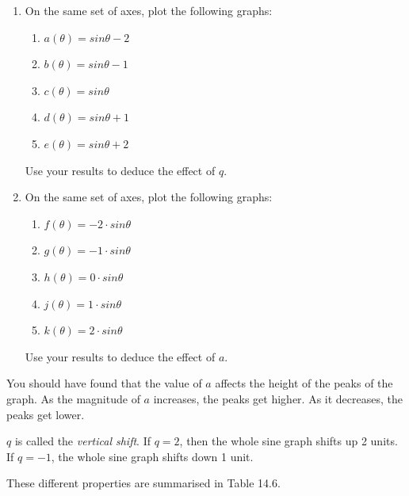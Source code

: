 \label{m39414*id84695}\begin{enumerate}[noitemsep, label=\textbf{\arabic*}. ] 
\label{m39414*uid34}\item On the same set of axes, plot the following graphs:
\label{m39414*id84710}\begin{enumerate}[noitemsep, label=\textbf{\alph*}. ] 
\label{m39414*uid35}\item $a\left(\theta \right)=sin\theta -2$\label{m39414*uid36}\item $b\left(\theta \right)=sin\theta -1$\label{m39414*uid37}\item $c\left(\theta \right)=sin\theta $\label{m39414*uid38}\item $d\left(\theta \right)=sin\theta +1$\label{m39414*uid39}\item $e\left(\theta \right)=sin\theta +2$\end{enumerate}
Use your results to deduce the effect of $q$.
\label{m39414*uid40}\item On the same set of axes, plot the following graphs:
\label{m39414*id84931}\begin{enumerate}[noitemsep, label=\textbf{\alph*}. ] 
\label{m39414*uid41}\item $f\left(\theta \right)=-2\ensuremath{\cdot}sin\theta $\label{m39414*uid42}\item $g\left(\theta \right)=-1\ensuremath{\cdot}sin\theta $\label{m39414*uid43}\item $h\left(\theta \right)=0\ensuremath{\cdot}sin\theta $\label{m39414*uid44}\item $j\left(\theta \right)=1\ensuremath{\cdot}sin\theta $\label{m39414*uid45}\item $k\left(\theta \right)=2\ensuremath{\cdot}sin\theta $\end{enumerate}
Use your results to deduce the effect of $a$.
\end{enumerate}
\label{m39414*id85165}You should have found that the value of $a$ affects the height of the peaks of the graph. As the magnitude of $a$ increases, the peaks get higher. As it decreases, the peaks get lower.\par 
\label{m39414*id85188}$q$ is called the \textsl{vertical shift}. If $q=2$, then the whole sine graph shifts up 2 units. If $q=-1$, the whole sine graph shifts down 1 unit.\par 
\label{m39414*id85237}These different properties are summarised in Table 14.6.\par 

